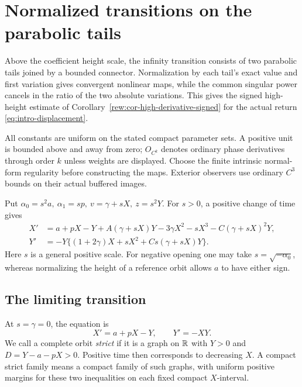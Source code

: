 \section{Normalized transitions on the parabolic tails}
\label{sec:source-normalization}

Above the coefficient height scale, the infinity transition consists
of two parabolic tails joined by a bounded connector. Normalization by
each tail's exact value and first variation gives convergent nonlinear
maps, while the common singular power cancels in the ratio of the two
absolute variations. This gives the signed high-height estimate of
Corollary~\ref{rew:cor-high-derivative-signed} for the actual return
\eqref{eq:intro-displacement}.

All constants are uniform on the stated compact parameter sets.
A positive unit is bounded above and away from zero;
\(O_{C^k}\) denotes ordinary phase derivatives through order \(k\)
unless weights are displayed. Choose the finite intrinsic normal-form
regularity before constructing the maps. Exterior observers use
ordinary \(C^3\) bounds on their actual buffered images.

Put \(\alpha _0=s^2a,\ \alpha _1=sp,\ v=\gamma+sX,\ z=s^2Y\).
For \(s>0\), a positive change of time gives
\begin{equation}\label{ann:source-field}
\begin{split}
 X'&=a+pX-Y+A(\gamma+sX)Y-3\gamma X^2-sX^3
                 -C(\gamma+sX)^2Y,\\
 Y'&=-Y\{(1+2\gamma)X+sX^2+Cs(\gamma+sX)Y\}.
\end{split}
\end{equation}
Here \(s\) is a general positive scale. For negative opening one may
take \(s=\sqrt{-\alpha _0}\), whereas normalizing the height of a
reference orbit allows \(a\) to have either sign.

\subsection{The limiting transition}
\label{ann:subsec-source-scattering}

At \(s=\gamma=0\), the equation is
\begin{equation}\label{ann:limiting-source}
 X'=a+pX-Y,\qquad Y'=-XY.
\end{equation}
We call a complete orbit \emph{strict} if it is a graph on \(\mathbb R\)
with \(Y>0\) and \(D=Y-a-pX>0\). Positive time then corresponds to
decreasing \(X\). A compact strict family means a compact family of
such graphs, with uniform positive margins for these two inequalities
on each fixed compact \(X\)-interval.

